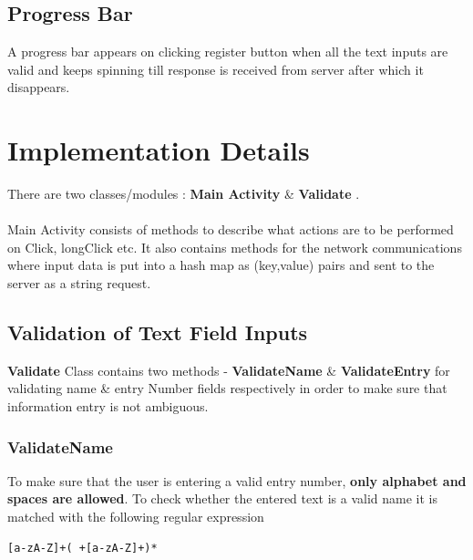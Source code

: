 \documentclass[12pt]{article}
\begin{document}
\subsection{Progress Bar}
A progress bar appears on clicking register button when all the text inputs are valid and keeps spinning till response is received from server after which it disappears.

\section{Implementation Details}
There are two classes/modules : \textbf{Main Activity} \& \textbf{Validate} . \\ \\
Main Activity consists of methods to describe what actions are to be performed on Click, longClick etc. It also contains methods for the network communications where input data is put into a hash map as (key,value) pairs and sent to the server as a string request.       
\subsection{Validation of Text Field Inputs}
\vspace{0.5cm}
\textbf{Validate} Class contains two methods - \textbf{ValidateName} \& \textbf{ValidateEntry} for validating name \& entry Number fields respectively in order to make sure that information entry is not ambiguous.
\subsubsection{ValidateName}  To make sure that the user is entering a valid entry number,
\textbf{only alphabet and spaces are allowed}. To check whether the entered text is a valid name it is matched with the following regular expression \begin{verbatim}[a-zA-Z]+( +[a-zA-Z]+)* \end{verbatim}\cite{regex}
\end{document}
